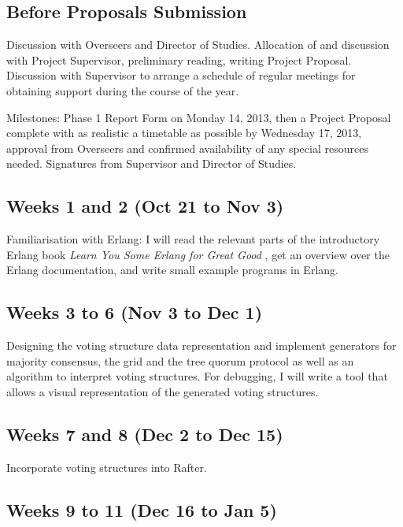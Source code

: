 \documentclass[12pt]{scrartcl}
\begin{document}
\subsection{Before Proposals Submission%
  \label{before-proposals-submission}%
}

Discussion with Overseers and Director of Studies. Allocation of and discussion with Project Supervisor, preliminary reading, writing Project Proposal. Discussion with Supervisor to arrange a schedule of regular meetings for obtaining support during the course of the year.

Milestones: Phase 1 Report Form on Monday 14, 2013, then a Project Proposal complete with as realistic a timetable as possible by Wednesday 17, 2013, approval from Overseers and confirmed availability of any special resources needed. Signatures from Supervisor and Director of Studies.


\subsection{Weeks 1 and 2 (Oct 21 to Nov 3)%
  \label{weeks-1-and-2-oct-21-to-nov-3}%
}

Familiarisation with Erlang: I will read the relevant parts of the introductory Erlang book \emph{Learn You Some Erlang for Great Good} \cite{lysefgg}, get an overview over the Erlang documentation, and write small example programs in Erlang.


\subsection{Weeks 3 to 6 (Nov 3 to Dec 1)%
  \label{weeks-3-to-6-nov-3-to-dec-1}%
}

Designing the voting structure data representation and implement generators for majority consensus, the grid and the tree quorum protocol as well as an algorithm to interpret voting structures. For debugging, I will write a tool that allows a visual representation of the generated voting structures.


\subsection{Weeks 7 and 8 (Dec 2 to Dec 15)%
  \label{weeks-7-and-8-dec-2-to-dec-15}%
}

Incorporate voting structures into Rafter.


\subsection{Weeks 9 to 11 (Dec 16 to Jan 5)%
  \label{weeks-9-to-11-dec-16-to-jan-5}%
}
\end{document}

